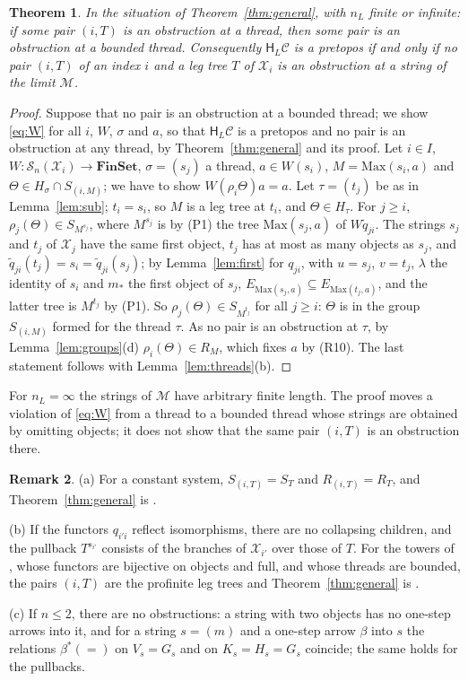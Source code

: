 \documentclass[11pt]{amsart}
\newtheorem{thm}{Theorem}[section]
\theoremstyle{definition}
\newtheorem{rem}[thm]{Remark}
\newcommand{\Fin}{\mathbf{FinSet}}
\newcommand{\Max}{\mathrm{Max}}
\newcommand{\HH}{\mathsf H}
\newcommand{\cX}{\mathcal X}
\newcommand{\cC}{\mathcal C}
\newcommand{\cM}{\mathcal M}
\newcommand{\cS}{\mathcal S}
\begin{document}
\begin{thm}\label{thm:bounded}
In the situation of Theorem~\ref{thm:general}, with $n_L$ finite or
infinite: if some pair $(i,T)$ is an obstruction at a thread, then
some pair is an obstruction at a bounded thread. Consequently
$\HH_L\cC$ is a pretopos if and only if no pair $(i,T)$ of an index
$i$ and a leg tree $T$ of $\cX_i$ is an obstruction at a string of the
limit $\cM$.
\end{thm}
\begin{proof}
Suppose that no pair is an obstruction at a bounded thread; we show
\eqref{eq:W} for all $i$, $W$, $\sigma$ and $a$, so that $\HH_L\cC$ is
a pretopos and no pair is an obstruction at any thread, by
Theorem~\ref{thm:general} and its proof. Let $i\in I$,
$W\colon\cS_n(\cX_i)\to\Fin$, $\sigma=(s_j)$ a thread, $a\in W(s_i)$,
$M=\Max(s_i,a)$ and $\Theta\in H_\sigma\cap S_{(i,M)}$; we have to
show $W(\rho_i\Theta)a=a$. Let $\tau=(t_j)$ be as in
Lemma~\ref{lem:sub}; $t_i=s_i$, so $M$ is a leg tree at $t_i$, and
$\Theta\in H_\tau$. For $j\ge i$, $\rho_j(\Theta)\in S_{M^{s_j}}$,
where $M^{s_j}$ is by (P1) the tree $\Max(s_j,a)$ of $W\tilde q_{ji}$.
The strings $s_j$ and $t_j$ of $\cX_j$ have the same first object,
$t_j$ has at most as many objects as $s_j$, and $\tilde
q_{ji}(t_j)=s_i=\tilde q_{ji}(s_j)$; by Lemma~\ref{lem:first} for
$q_{ji}$, with $u=s_j$, $v=t_j$, $\lambda$ the identity of $s_i$ and
$m_*$ the first object of $s_j$, $E_{\Max(s_j,a)}\subseteq
E_{\Max(t_j,a)}$, and the latter tree is $M^{t_j}$ by (P1). So
$\rho_j(\Theta)\in S_{M^{t_j}}$ for all $j\ge i$: $\Theta$ is in the
group $S_{(i,M)}$ formed for the thread $\tau$. As no pair is an
obstruction at $\tau$, by Lemma~\ref{lem:groups}(d)
$\rho_i(\Theta)\in R_M$, which fixes $a$ by (R10). The last statement
follows with Lemma~\ref{lem:threads}(b).
\end{proof}

For $n_L=\infty$ the strings of $\cM$ have arbitrary finite length.
The proof moves a violation of \eqref{eq:W} from a thread to a bounded
thread whose strings are obtained by omitting objects; it does not
show that the same pair $(i,T)$ is an obstruction there.

\begin{rem}\label{rem:special}
(a) For a constant system, $S_{(i,T)}=S_T$ and $R_{(i,T)}=R_T$, and
Theorem~\ref{thm:general} is \cite[Thm.~6.15]{Strings}.

(b) If the functors $q_{i'i}$ reflect isomorphisms, there are no
collapsing children, and the pullback $T^{s_{i'}}$ consists of the
branches of $\cX_{i'}$ over those of $T$. For the towers of
\cite[\S7]{Proftrees}, whose functors are bijective on objects and
full, and whose threads are bounded, the pairs $(i,T)$ are the profinite leg
trees and Theorem~\ref{thm:general} is \cite[Thm.~8.2]{Proftrees}.

(c) If $n\le2$, there are no obstructions: a string with two objects
has no one-step arrows into it, and for a string $s=(m)$ and a
one-step arrow $\beta$ into $s$ the relations $\beta^*(=)$ on
$V_s=G_s$ and on $K_s=H_s=G_s$ coincide; the same holds for the
pullbacks.
\end{rem}
\end{document}

